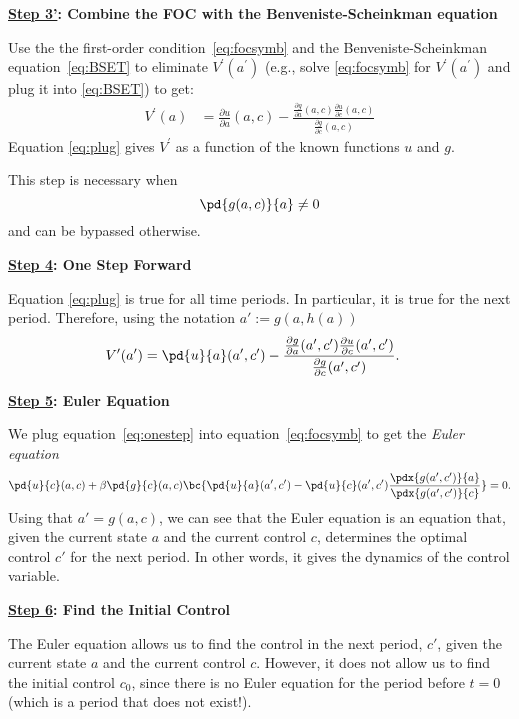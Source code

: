 \documentclass[\topdir/lecture\_notes.tex]{subfiles}
\begin{document}
\textbf{\underline{Step 3'}: Combine the FOC with the Benveniste-Scheinkman equation}

Use the the first-order condition~\eqref{eq:focsymb} and the Benveniste-Scheinkman equation~\eqref{eq:BSET} to eliminate $V^{\prime}(a^{\prime})$ (e.g., solve \eqref{eq:focsymb} for $V^{\prime}(a^{\prime})$ and plug it into \eqref{eq:BSET}) to get:
\begin{align}
V^{\prime}(a)&=\frac{\partial u}{\partial a}(a,c)-\frac{\frac{\partial g}{\partial a}(a,c)\frac{\partial u}{\partial c}(a,c)}{\frac{\partial g}{\partial c}(a,c)} \label{eq:plug}
\end{align}
Equation \eqref{eq:plug} gives $V^\prime$ as a function of the known functions $u$ and $g$.

This step is necessary when \[\pd{g(a,c)}{a}\neq 0\] and can be bypassed otherwise. 

\textbf{\underline{Step 4}: One Step Forward}

Equation \eqref{eq:plug} is true for all time periods. In particular, it is true for the next period. Therefore, using the notation $a':=g(a,h(a))$
\begin{align}
V^{\prime}(a')&=\pd{u}{a}(a',c')-\frac{\frac{\partial g}{\partial a}(a',c')\frac{\partial u}{\partial c}(a',c')}{\frac{\partial g}{\partial c}(a',c')}.\label{eq:onestep}
\end{align}

\textbf{\underline{Step 5}: Euler Equation}

We plug equation~\eqref{eq:onestep} into equation~\eqref{eq:focsymb} to get the \emph{Euler equation}
\begin{equation*}
\pd{u}{c}(a,c)+\beta \pd{g}{c}(a,c) \bc{\pd{u}{a}(a',c')-\pd{u}{c}(a',c') \frac{\pdx{g(a',c')}{a}}{\pdx{g(a',c')}{c}}}=0.
\end{equation*}
Using that $a' = g(a, c)$, we can see that the Euler equation is an equation that, given the current state $a$ and the current control $c$, determines the optimal control $c'$ for the next period. In other words, it gives the dynamics of the control variable.

\textbf{\underline{Step 6}: Find the Initial Control}

The Euler equation allows us to find the control in the next period, $c'$, given the current state $a$ and the current control $c$. However, it does not allow us to find the initial control $c_0$, since there is no Euler equation for the period before $t=0$ (which is a period that does not exist!).
\end{document}
